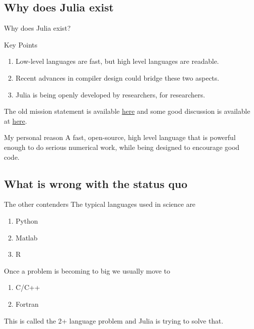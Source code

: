 \documentclass{beamer}
\begin{document}
\subsection{Why does Julia exist}
\begin{frame}{Why does Julia exist?}
  \begin{block}{Key Points}
    \begin{enumerate}
    	   	
      \item Low-level languages are fast, but high level languages are readable.
      \item Recent advances in compiler design could bridge these two aspects.
      \item Julia is being openly developed by researchers, for researchers.
    \end{enumerate}
  \end{block}
  The old mission statement is available \href{https://julialang.org/blog/2012/02/why-we-created-julia}{\color{blue} here} and some good discussion is available at \href{https://discourse.julialang.org/t/julia-motivation-why-werent-numpy-scipy-numba-good-enough/2236/}{\color{blue} here}. 
  \begin{block}{My personal reason}
    A fast, open-source, high level language that is powerful enough to do serious numerical work, while being designed to encourage good code.
  \end{block}

\end{frame}
\subsection{What is wrong with the status quo}
\begin{frame}{The other contenders}
  The typical languages used in science are
  \begin{enumerate}
    \item Python
    \item Matlab
    \item R
  \end{enumerate}

  Once a problem is becoming to big we usually move to
  \begin{enumerate}
    \item C/C++
    \item Fortran
  \end{enumerate}
  This is called the 2+ language problem and Julia is trying to solve that.
\end{frame}
\end{document}
